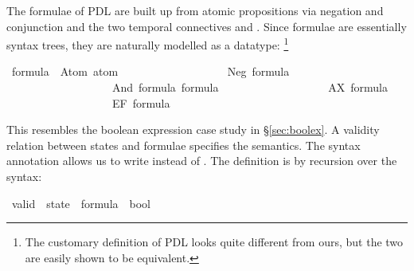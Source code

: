 %
\begin{isabellebody}%
\def\isabellecontext{PDL}%
%
\isadelimtheory
%
\endisadelimtheory
%
\isatagtheory
%
\endisatagtheory
{\isafoldtheory}%
%
\isadelimtheory
%
\endisadelimtheory
%
\isamarkuptrue%
%
\begin{isamarkuptext}%
The formulae of PDL are built up from atomic propositions via
negation and conjunction and the two temporal
connectives  and \@. Since formulae are essentially
syntax trees, they are naturally modelled as a datatype:%
\footnote{The customary definition of PDL
\cite{HarelKT-DL} looks quite different from ours, but the two are easily
shown to be equivalent.}%
\end{isamarkuptext}%
\isamarkuptrue%
\isamarkupfalse%
\ formula\ {}\ Atom\ {}atom{}\isanewline
\ \ \ \ \ \ \ \ \ \ \ \ \ \ \ \ \ \ {}\ Neg\ formula\isanewline
\ \ \ \ \ \ \ \ \ \ \ \ \ \ \ \ \ \ {}\ And\ formula\ formula\isanewline
\ \ \ \ \ \ \ \ \ \ \ \ \ \ \ \ \ \ {}\ AX\ formula\isanewline
\ \ \ \ \ \ \ \ \ \ \ \ \ \ \ \ \ \ {}\ EF\ formula%
\begin{isamarkuptext}%
\noindent
This resembles the boolean expression case study in
\S\ref{sec:boolex}.
A validity relation between states and formulae specifies the semantics.
The syntax annotation allows us to write  instead of
\hbox{}. The definition is by recursion over the syntax:%
\end{isamarkuptext}%
\isamarkuptrue%
\isamarkupfalse%
\ valid\ {}{}\ {}state\ {}\ formula\ {}\ bool{}\ \ \ {}{}{}{}\ {}\ {}{}{}\ {}{}{}{}{}{}{}\ {}{}{}\isanewline

\end{isabellebody}
